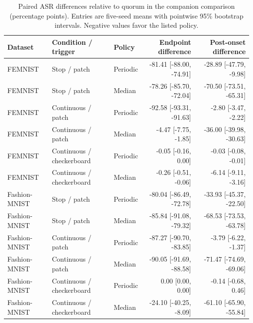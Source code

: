 \begin{table}[t]
\caption{Paired ASR differences relative to quorum in the companion comparison (percentage points). Entries are five-seed means with pointwise 95\% bootstrap intervals. Negative values favor the listed policy.}
\label{tab:paired}
\centering\small\begin{tabular}{lllrr}
\toprule
Dataset & Condition / trigger & Policy & Endpoint difference & Post-onset difference \\
\midrule
FEMNIST & Stop / patch & Periodic & -81.41 [-88.00, -74.91] & -28.89 [-47.79, -9.98] \\
FEMNIST & Stop / patch & Median & -78.26 [-85.70, -72.04] & -70.50 [-73.51, -65.31] \\
FEMNIST & Continuous / patch & Periodic & -92.58 [-93.31, -91.63] & -2.80 [-3.47, -2.22] \\
FEMNIST & Continuous / patch & Median & -4.47 [-7.75, -1.85] & -36.00 [-39.98, -30.63] \\
FEMNIST & Continuous / checkerboard & Periodic & -0.05 [-0.16, 0.00] & -0.03 [-0.08, -0.01] \\
FEMNIST & Continuous / checkerboard & Median & -0.26 [-0.51, -0.06] & -6.14 [-9.11, -3.16] \\
Fashion-MNIST & Stop / patch & Periodic & -80.04 [-86.49, -72.78] & -33.93 [-45.37, -22.50] \\
Fashion-MNIST & Stop / patch & Median & -85.84 [-91.08, -79.32] & -68.53 [-73.53, -63.78] \\
Fashion-MNIST & Continuous / patch & Periodic & -87.27 [-90.70, -83.85] & -3.79 [-6.22, -1.37] \\
Fashion-MNIST & Continuous / patch & Median & -90.05 [-91.69, -88.58] & -71.47 [-74.69, -69.06] \\
Fashion-MNIST & Continuous / checkerboard & Periodic & 0.00 [0.00, 0.00] & -0.14 [-0.68, 0.46] \\
Fashion-MNIST & Continuous / checkerboard & Median & -24.10 [-40.25, -8.09] & -61.10 [-65.90, -55.84] \\
\bottomrule\end{tabular}
\end{table}
